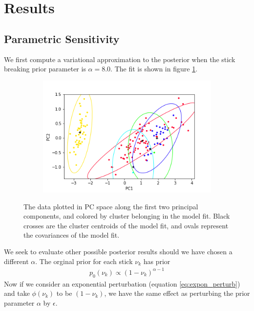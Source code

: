 \documentclass[a4paper]{article}
\begin{document}
\section{Results}

\subsection{Parametric Sensitivity}
We first compute a variational approximation to the posterior when the stick breaking
prior parameter is $\alpha = 8.0$. The fit is shown in figure \ref{fig:init_fit}.

\begin{figure}[h!]
	\centering
	\begin{subfigure}[t]{0.4\textwidth}
		\includegraphics[width = \textwidth]{./parametric_sens_results/init_fit_alpha8.png}
	\end{subfigure}
	\caption{The data plotted in PC space along the first two principal components, and colored by
	cluster belonging in the model fit. Black crosses are the cluster centroids of the model fit,
  and ovals represent the
  covariances of the model fit. }
	\label{fig:init_fit}
\end{figure}

We seek to evaluate other possible posterior results should we have chosen a different
$\alpha$. The orginal prior for each stick $\nu_k$ has prior
\begin{align}
  p_0(\nu_k) \propto (1 - \nu_k)^{\alpha - 1}
\end{align}
Now if we consider an exponential perturbation (equation \ref{eq:expon_perturb}) and
take $\phi(\nu_k)$ to be $(1 - \nu_k)$,
we have the same effect as perturbing the prior parameter $\alpha$  by $\epsilon$.
\end{document}
